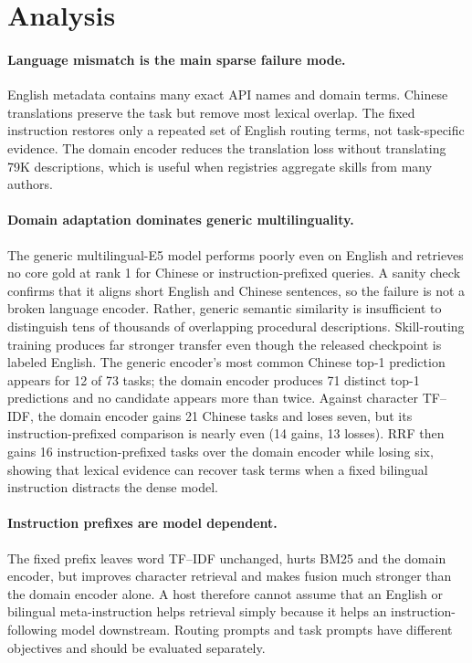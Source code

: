 \documentclass[letterpaper]{article}
\begin{document}
\section{Analysis}

\paragraph{Language mismatch is the main sparse failure mode.}
English metadata contains many exact API names and domain terms.  Chinese
translations preserve the task but remove most lexical overlap.  The fixed
instruction restores only a repeated set of English routing terms, not
task-specific evidence.  The domain encoder reduces the translation loss
without translating 79K descriptions, which is useful when registries aggregate
skills from many authors.

\paragraph{Domain adaptation dominates generic multilinguality.}
The generic multilingual-E5 model performs poorly even on English and retrieves
no core gold at rank 1 for Chinese or instruction-prefixed queries.  A sanity check confirms
that it aligns short English and Chinese sentences, so the failure is not a
broken language encoder.  Rather, generic semantic similarity is insufficient
to distinguish tens of thousands of overlapping procedural descriptions.
Skill-routing training produces far stronger transfer even though the released
checkpoint is labeled English.  The generic encoder's most common Chinese
top-1 prediction appears for 12 of 73 tasks; the domain encoder produces 71
distinct top-1 predictions and no candidate appears more than twice.  Against
character TF--IDF, the domain encoder gains 21 Chinese tasks and loses seven,
but its instruction-prefixed comparison is nearly even (14 gains, 13 losses).
RRF then gains 16 instruction-prefixed tasks over the domain encoder while
losing six, showing that lexical evidence can recover task terms when a fixed
bilingual instruction distracts the dense model.

\paragraph{Instruction prefixes are model dependent.}
The fixed prefix leaves word TF--IDF unchanged, hurts BM25 and the domain
encoder, but improves character retrieval and makes fusion much stronger than
the domain encoder alone.  A host therefore cannot assume that an English or
bilingual meta-instruction helps retrieval simply because it helps an
instruction-following model downstream.  Routing prompts and task prompts have
different objectives and should be evaluated separately.
\end{document}
